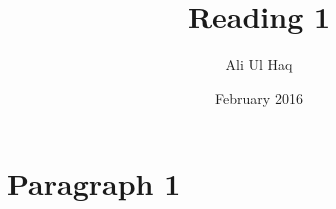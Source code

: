 \documentclass[11pt,a4paper,twoside]{article}
\title{Reading 1}
\author{Ali Ul Haq}
\date{February 2016}
\begin{document}
 
\maketitle

\section{Paragraph 1}

 
\end{document}
